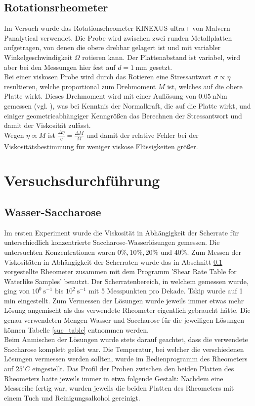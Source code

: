 \documentclass[11pt,a4paper,oneside]{scrartcl}
\begin{document}
\subsection{Rotationsrheometer}\label{rheometer}
Im Versuch wurde das Rotationsrheometer KINEXUS ultra+ von Malvern Panalytical verwendet. Die Probe wird zwischen zwei runden Metallplatten aufgetragen, von denen die obere drehbar gelagert ist und mit variabler Winkelgeschwindigkeit $\Omega$ rotieren kann. Der Plattenabstand ist variabel, wird aber bei den Messungen hier fest auf $d=1\ \mathrm{mm}$ gesetzt. \\
Bei einer viskosen Probe wird durch das Rotieren eine Stressantwort $\sigma\propto\eta$ resultieren, welche proportional zum Drehmoment $M$ ist, welches auf die obere Platte wirkt. Dieses Drehmoment wird mit einer Auflösung von $0.05\ \mathrm{nNm}$ gemessen (vgl. \cite{malvern_2017}), was bei Kenntnis der Normalkraft, die auf die Platte wirkt, und einiger geometrieabhängiger Kenngrößen das Berechnen der Stressantwort und damit der Viskosität zulässt.\\
Wegen $\eta\propto M$ ist $\frac{\Delta\eta}{\eta}=\frac{\Delta M}{M}$ und damit der relative Fehler bei der Viskositätsbestimmung für weniger viskose Flüssigkeiten größer.
\section{Versuchsdurchführung}
\subsection{Wasser-Saccharose}\label{H2O-Suc_Anmischen}
Im ersten Experiment wurde die Viskosität in Abhängigkeit der Scherrate für unterschiedlich konzentrierte Saccharose-Wasserlösungen gemessen. Die untersuchten Konzentrationen waren $0\%, 10\%, 20\%$ und  $40\%$. Zum Messen der
Viskositäten in Abhängigkeit der Scherraten wurde das in Abschnitt \ref{rheometer} vorgestellte Rheometer zusammen mit dem Programm 'Shear Rate Table for Waterlike Samples' benutzt. Der Scherratenbereich,
in welchem gemessen wurde, ging von $10^0\ \mathrm s^{-1}$ bis $10^2\ \mathrm s^{-1}$ mit 5 Messpunkten pro Dekade. Tskip wurde auf 1 min eingestellt. Zum Vermessen der Lösungen wurde jeweils immer etwas mehr Lösung angemischt als das
verwendete Rheometer eigentlich gebraucht hätte. Die genau verwendeten Mengen Wasser und Saccharose für die jeweiligen Lösungen können Tabelle \ref{suc_table} entnommen werden. \\
Beim Anmischen der Lösungen wurde stets darauf geachtet, dass die
verwendete Saccharose komplett gelöst war. Die Temperatur, bei welcher die verschiedenen Lösungen vermessen werden sollten, wurde im Bedienprogramm des Rheometers auf $25^{\circ}C$ eingestellt. Das Profil der Proben
zwischen den beiden Platten des Rheometers hatte jeweils immer in etwa folgende Gestalt:
Nachdem eine Messreihe fertig war, wurden jeweils die beiden Platten des
Rheometers mit einem Tuch und Reinigungsalkohol gereinigt.
\end{document}
